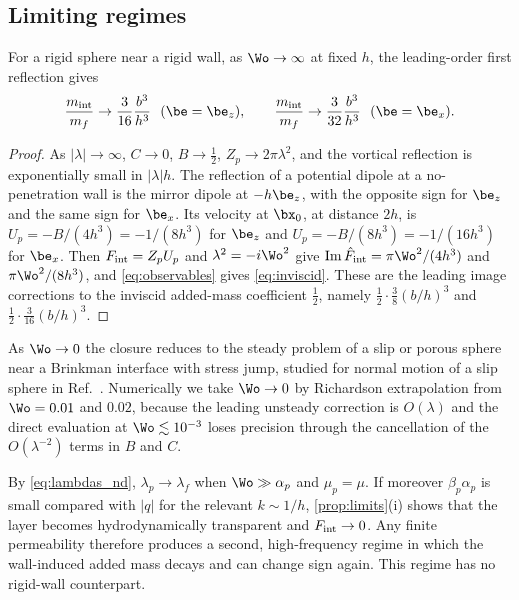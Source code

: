 \subsection{Limiting regimes}\label{sec:limits}
\begin{proposition}\label{prop:inviscid}
For a rigid sphere near a rigid wall, as $\Wo\to\infty$ at fixed $h$, the leading-order first reflection gives
\begin{equation}
  \frac{m_{\rm int}}{m_f}\to\frac{3}{16}\frac{b^3}{h^3}\ \ (\be=\be_z),\qquad
  \frac{m_{\rm int}}{m_f}\to\frac{3}{32}\frac{b^3}{h^3}\ \ (\be=\be_x).
  \label{eq:inviscid}
\end{equation}
\end{proposition}
\begin{proof}
As $|\lambda|\to\infty$, $C\to0$, $B\to\tfrac12$, $Z_p\to2\pi\lambda^2$, and the vortical reflection is exponentially
small in $|\lambda|h$. The reflection of a potential dipole at a no-penetration wall is the mirror dipole at $-h\be_z$,
with the opposite sign for $\be_z$ and the same sign for $\be_x$. Its velocity at $\bx_0$, at distance $2h$, is
$U_p=-B/(4h^3)=-1/(8h^3)$ for $\be_z$ and $U_p=-B/(8h^3)=-1/(16h^3)$ for $\be_x$. Then
$F_{\rm int}=Z_pU_p$ and $\lambda^2=-i\Wo^2$ give $\operatorname{Im}\hat F_{\rm int}=\pi\Wo^2/(4h^3)$ and
$\pi\Wo^2/(8h^3)$, and \cref{eq:observables} gives \cref{eq:inviscid}.
These are the leading image corrections to the inviscid added-mass coefficient $\tfrac12$, namely
$\tfrac12\cdot\tfrac38(b/h)^3$ and $\tfrac12\cdot\tfrac3{16}(b/h)^3$.
\end{proof}

\begin{remark}\label{rem:steady}
As $\Wo\to0$ the closure reduces to the steady problem of a slip or porous sphere near a Brinkman interface with stress
jump, studied for normal motion of a slip sphere in Ref.~. Numerically we take
$\Wo\to0$ by Richardson extrapolation from $\Wo=0.01$ and $0.02$, because the leading unsteady correction is
$O(\lambda)$ and the direct evaluation at $\Wo\lesssim10^{-3}$ loses precision through the cancellation of the
$O(\lambda^{-2})$ terms in $B$ and $C$.
\end{remark}

\begin{remark}\label{rem:transparent}
By \cref{eq:lambdas_nd}, $\lambda_p\to\lambda_f$ when $\Wo\gg\alpha_p$ and $\mu_p=\mu$. If moreover $\beta_p\alpha_p$ is small
compared with $|q|$ for the relevant $k\sim1/h$, \cref{prop:limits}(i) shows that the layer becomes hydrodynamically
transparent and $F_{\rm int}\to0$. Any finite permeability therefore produces a second, high-frequency regime in which
the wall-induced added mass decays and can change sign again. This regime has no rigid-wall counterpart.
\end{remark}
